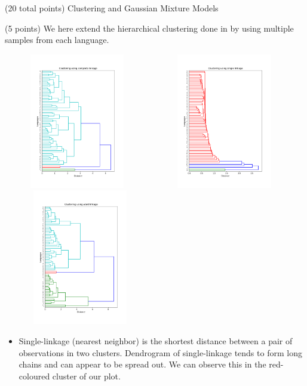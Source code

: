 \documentclass[12pt]{article}
\begin{document}
\begin{question}{(20 total points) Clustering and Gaussian Mixture Models}
\begin{subquestion}{(5 points)
       We here extend the hierarchical clustering done in  by
       using multiple samples from each language.
     }
      \begin{answerbox}{50em}
         \begin{center}
            \includegraphics[width=0.48\textwidth, height=16em]{results/3_4_complete.png}\hfill
            \includegraphics[width=0.48\textwidth, height=16em]{results/3_4_single.png}\hfill
            \includegraphics[width=0.5\textwidth, height=16em]{results/3_4_ward.png}
         \end{center}
         \begin{itemize}
             \item Single-linkage (nearest neighbor) is the shortest distance between a pair of observations in two clusters. Dendrogram of single-linkage tends to form long chains and can appear to be spread out. We can observe this in the red-coloured cluster of our plot.

\end{itemize}
\end{answerbox}
\end{subquestion}
\end{question}
\end{document}
